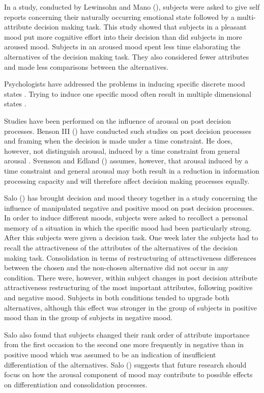 In a study, conducted by Lewinsohn and Mano
(\citeyear{LewinsohnMano93}), subjects were asked to give self reports
concerning their naturally occurring emotional state followed by a
multi-attribute decision making task. This study showed that subjects
in a pleasant mood put more cognitive effort into their decision than
did subjects in more aroused mood. Subjects in an aroused mood spent
less time elaborating the alternatives of the decision making task.
They also considered fewer attributes and made less comparisons
between the alternatives.

Psychologists have addressed the problems in inducing specific
discrete mood states \parencite{Izard77, Polivy81}.  Trying to induce
one specific mood often result in multiple dimensional states
\parencite{Polivy81}.

Studies have been performed on the influence of arousal on post
decision processes.  Benson III (\citeyear{Benson93}) have conducted
such studies on 
post decision processes and framing when the decision is made under a
time constraint.  He does, however, not distinguish arousal, induced
by a time constraint from general arousal \parencite{Benson93,
  Svensson96}.  Svensson and Edland (\citeyear{SvenssonEdland87})
assumes, however, that arousal induced by a time constraint and
general arousal may both result in a reduction in information
processing capacity and will therefore affect decision making
processes equally.

Salo (\citeyear{Salo96}) has brought decision and mood theory together
in a study concerning the influence of manipulated negative and
positive mood on post decision processes.  In order to induce
different moods, subjects were asked to recollect a personal memory of
a situation in which the specific mood had been particularly strong.
After this subjects were given a decision task.  One week later the
subjects had to recall the attractiveness of the attributes of the
alternatives  of the decision making task.  Consolidation in terms of
restructuring of attractiveness differences between the chosen and the
non-chosen alternative did not occur in any condition.  There were,
however, within subject changes in post decision attribute
attractiveness restructuring of  the most important attributes,
following positive and negative mood.  Subjects in both conditions
tended to upgrade both alternatives, although this effect was stronger
in the group of subjects in positive mood than in the group of
subjects in negative mood.

Salo also found that subjects changed their rank order of attribute
importance from the first occasion to the second one more frequently
in negative than in positive mood which was assumed to be an
indication of insufficient differentiation of the alternatives.  Salo
(\citeyear{Salo96}) suggests that future research should focus on how
the arousal component of mood may contribute to possible effects on
differentiation and consolidation processes.


